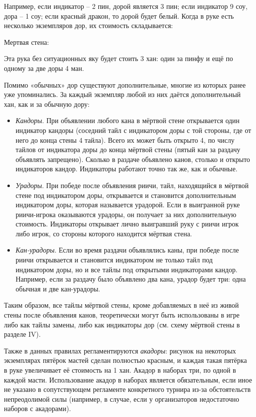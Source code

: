 Например, если индикатор – 2 пин, дорой является 3 пин; если индикатор 9 соу, дора – 1 соу; если красный дракон, то дорой будет белый.
Когда в руке есть несколько экземпляров дор, их стоимость складывается:


Мертвая стена:

Эта рука без ситуационных яку будет стоить 3 хан: один за пинфу и ещё по одному за две доры 4 ман.

Помимо «обычных» дор существуют дополнительные, многие из которых ранее уже упоминались. За каждый экземпляр любой из них даётся дополнительный хан, как и за обычную дору:
\begin{itemize}
	\item \textit{Кандоры}. При объявлении любого кана в мёртвой стене открывается один индикатор кандоры (соседний тайл с индикатором доры с той стороны, где от него до конца стены 4 тайла). Всего их может быть открыто 4, по числу тайлов от индикатора доры до конца мёртвой стены (пятый кан за раздачу объявлять запрещено). Сколько в раздаче объявлено канов, столько и открыто индикаторов кандор. Индикаторы работают точно так же, как и обычные.
	\item \textit{Урадоры}. При победе после объявления риичи, тайл, находящийся в мёртвой стене под индикатором доры, открывается и становится дополнительным индикатором доры, которая называется урадорой. Если в выигранной руке риичи-игрока оказываются урадоры, он получает за них дополнительную стоимость. Индикаторы открывает лично выигравший руку с риичи игрок либо игрок, со стороны которого находится мёртвая стена.
	\item \textit{Кан-урадоры}. Если во время раздачи объявлялись каны, при победе после риичи открывается и становится индикатором не только тайл под индикатором доры, но и все тайлы под открытыми индикаторами кандор. Например, если за раздачу было объявлено два кана, урадор будет три: одна обычная и две кан-урадоры.
\end{itemize}

Таким образом, все тайлы мёртвой стены, кроме добавляемых в неё из живой стены после объявления канов, теоретически могут быть использованы в игре либо как тайлы замены, либо как индикаторы дор (см. схему мёртвой стены в разделе IV).

Также в данных правилах регламентируются \textit{акадоры}: рисунок на некоторых экземплярах пятёрок мастей сделан полностью красным, и каждая такая пятёрка в руке увеличивает её стоимость на 1 хан. Акадор в наборах три, по одной в каждой масти. Использование акадор в наборах является обязательным, если иное не указано в сопутствующем регламенте конкретного турнира из-за обстоятельств непреодолимой силы (например, в случае, если у организаторов недостаточно наборов с акадорами).

